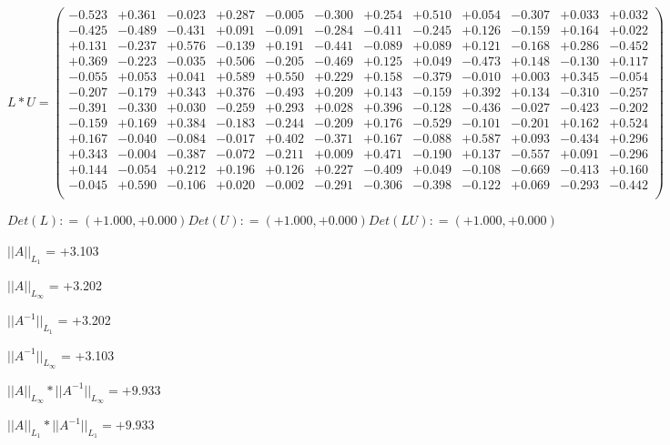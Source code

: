 \documentclass[9pt]{article}
\theoremstyle{plain}
\theoremstyle{definition}
\theoremstyle{remark}
\numberwithin{equation}{section}
\begin{document}
$L * U  = \left(
\begin{array}{
cccccccccccc}
-0.523 & +0.361 & -0.023 & +0.287 & -0.005 & -0.300 & +0.254 & +0.510 & +0.054 & -0.307 & +0.033 & +0.032 \\
-0.425 & -0.489 & -0.431 & +0.091 & -0.091 & -0.284 & -0.411 & -0.245 & +0.126 & -0.159 & +0.164 & +0.022 \\
+0.131 & -0.237 & +0.576 & -0.139 & +0.191 & -0.441 & -0.089 & +0.089 & +0.121 & -0.168 & +0.286 & -0.452 \\
+0.369 & -0.223 & -0.035 & +0.506 & -0.205 & -0.469 & +0.125 & +0.049 & -0.473 & +0.148 & -0.130 & +0.117 \\
-0.055 & +0.053 & +0.041 & +0.589 & +0.550 & +0.229 & +0.158 & -0.379 & -0.010 & +0.003 & +0.345 & -0.054 \\
-0.207 & -0.179 & +0.343 & +0.376 & -0.493 & +0.209 & +0.143 & -0.159 & +0.392 & +0.134 & -0.310 & -0.257 \\
-0.391 & -0.330 & +0.030 & -0.259 & +0.293 & +0.028 & +0.396 & -0.128 & -0.436 & -0.027 & -0.423 & -0.202 \\
-0.159 & +0.169 & +0.384 & -0.183 & -0.244 & -0.209 & +0.176 & -0.529 & -0.101 & -0.201 & +0.162 & +0.524 \\
+0.167 & -0.040 & -0.084 & -0.017 & +0.402 & -0.371 & +0.167 & -0.088 & +0.587 & +0.093 & -0.434 & +0.296 \\
+0.343 & -0.004 & -0.387 & -0.072 & -0.211 & +0.009 & +0.471 & -0.190 & +0.137 & -0.557 & +0.091 & -0.296 \\
+0.144 & -0.054 & +0.212 & +0.196 & +0.126 & +0.227 & -0.409 & +0.049 & -0.108 & -0.669 & -0.413 & +0.160 \\
-0.045 & +0.590 & -0.106 & +0.020 & -0.002 & -0.291 & -0.306 & -0.398 & -0.122 & +0.069 & -0.293 & -0.442 \\
\end{array}
\right)$ \newline 

$Det(L) :    = (+1.000,+0.000)     Det(U) :    = (+1.000,+0.000)     Det(LU) :    = (+1.000,+0.000)$

$||A||_{L_1}$  = +3.103

$||A||_{L_{\infty}}$ = +3.202

$||A^{-1}||_{L_1}$  = +3.202

$||A^{-1}||_{L_{\infty}}$ = +3.103

$||A||_{L_{\infty}} * ||A^{-1}||_{L_{\infty}} = +9.933$

$||A||_{L_1} * ||A^{-1}||_{L_1} = +9.933$
\end{document}
